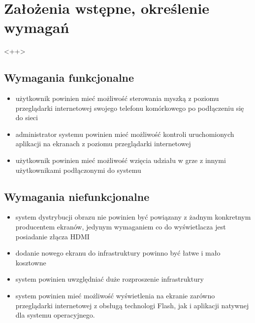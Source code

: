 \newpage
\section{Założenia wstępne, określenie wymagań}
\label{sec:requirement}<++>

\subsection{Wymagania funkcjonalne}

\begin{itemize}
	\item użytkownik powinien mieć możliwość sterowania myszką z poziomu przeglądarki internetowej swojego telefonu komórkowego po podłączeniu się do sieci
	\item administrator systemu powinien mieć możliwość kontroli uruchomionych aplikacji na ekranach z poziomu przeglądarki internetowej
	\item użytkownik powinien mieć możliwość wzięcia udziału w grze z innymi użytkownikami podłączonymi do systemu
\end{itemize}


\subsection{Wymagania niefunkcjonalne}
\begin{itemize}
	\item system dystrybucji obrazu nie powinien być powiązany z żadnym konkretnym producentem ekranów, jedynym wymaganiem co do wyświetlacza jest posiadanie złącza HDMI
	\item dodanie nowego ekranu do infrastruktury powinno być łatwe i mało kosztowne
	\item system powinien uwzględniać duże rozproszenie infrastruktury 
	\item system powinien mieć możliwość wyświetlenia na ekranie zarówno przeglądarki internetowej z obsługą technologi Flash, jak i aplikacji natywnej dla systemu operacyjnego.
\end{itemize}
